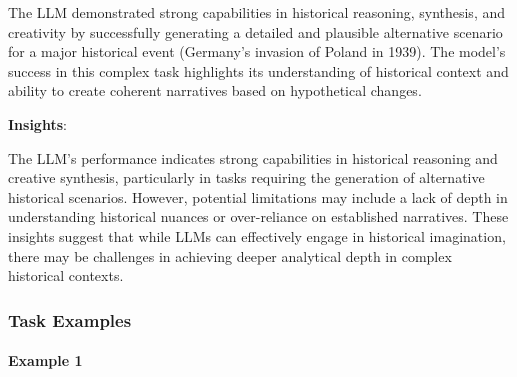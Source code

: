 \documentclass[fleqn,10pt]{wlscirep}
\begin{document}
The LLM demonstrated strong capabilities in historical reasoning,
synthesis, and creativity by successfully generating a detailed and
plausible alternative scenario for a major historical event (Germany's
invasion of Poland in 1939). The model's success in this complex task
highlights its understanding of historical context and ability to create
coherent narratives based on hypothetical changes.

\textbf{Insights}:

The LLM's performance indicates strong capabilities in historical
reasoning and creative synthesis, particularly in tasks requiring the
generation of alternative historical scenarios. However, potential
limitations may include a lack of depth in understanding historical
nuances or over-reliance on established narratives. These insights
suggest that while LLMs can effectively engage in historical
imagination, there may be challenges in achieving deeper analytical
depth in complex historical contexts.

\hypertarget{task-examples-17}{%
\subsubsection{Task Examples}\label{task-examples-17}}

\hypertarget{example-1-17}{%
\paragraph{Example 1}\label{example-1-17}}
\end{document}
